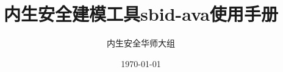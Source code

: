 \documentclass[UTF8,a4paper,12pt,oneside]{book}
\begin{document}
\title{\heiti 内生安全建模工具sbid-ava使用手册}
\author{\kaishu 内生安全华师大组}
\date{\today}

\frontmatter
\maketitle
\tableofcontents

\mainmatter









\backmatter
\end{document}
